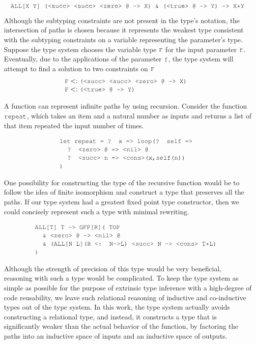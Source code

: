 \documentclass[acmsmall]{acmart}
\theoremstyle{definition}
\begin{document}
\[
  \J{ALL[X Y] (<succ> <succ> <zero> @ -> X) \& (<true> @ -> Y) -> X*Y}
\]

\noindent
Although the subtyping constraints are not present in the type's notation,
the intersection of paths is chosen because it represents the weakest type
consistent with the subtyping constraints on a variable representing the parameter's type. 
Suppose the type system chooses the variable type $\J{F}$ for the input parameter $\J{f}$.
Eventually, due to the applications of the parameter $\J{f}$, the type
system will attempt to find a solution to two constraints on $\J{F}$
\[
  \begin{array}[t]{@{} l}
    \J{F} \subtypes \J{(<succ> <succ> <zero> @ -> X)}
    \\
    \J{F} \subtypes \J{(<true> @ -> Y)}
  \end{array}
\]


A function can represent infinite paths by using recursion.
Consider the function $\J{repeat}$, which takes an item and a natural number
as inputs and returns a list of that item repeated the input number of times.

\[
  \begin{array}[t]{@{} l}
      \J{let repeat = ? x => loop(? self =>}
      \\
      \I \J{? <zero> @ => <nil> @}
      \\
      \I \J{? <succ> n => <cons>(x,self(n))}
      \\
      \J{)}
  \end{array}
\]

\noindent
One possibility for constructing the type of the recursive function would
be to follow the idea of finite isomorphism and construct a type 
that preserves all the paths. If our type system had a greatest fixed point
type constructor, then we could concisely represent such a type with minimal
rewriting.

\[
  \begin{array}[t]{@{} l}
      \J{ALL[T] T -> GFP[R]( TOP} 
      \\
      \I \J{\& <zero> @ -> <nil> @}
      \\
      \I \J{\& (ALL[N L](R <: N->L) <succ> N -> <cons> T*L)}
      \\
      \J{)} 
  \end{array}
\]

\noindent
Although the strength of precision of this type would be very beneficial,
reasoning with such a type would be complicated. To keep the type system as
simple as possible for the purpose of extrinsic type inference with a high-degree
of code reusability, we leave such relational reasoning of inductive and co-inductive types out of
the type system. 
In this work, the type system actually avoids constructing a relational type, and instead, it
constructs a type that is significantly weaker than the actual behavior of the function,
by factoring the paths into an inductive space of inputs and an inductive space of outputs. 
\end{document}
